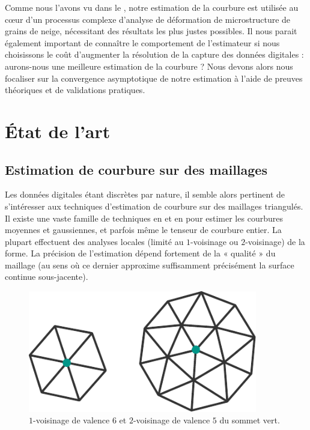 Comme nous l'avons vu dans le , notre estimation
de la courbure est utilisée au cœur d'un processus complexe d'analyse de
déformation de microstructure de grains de neige, nécessitant des résultats les
plus justes possibles. Il nous parait également important de connaître le
comportement de l'estimateur si nous choisissons le coût d'augmenter la résolution
de la capture des données digitales : aurons-nous une meilleure estimation de la
courbure ? Nous devons alors nous focaliser sur la convergence asymptotique de
notre estimation à l'aide de preuves théoriques et de validations pratiques.
%
\section{État de l'art}%
\label{sec:estimators:SOTA}
%
\subsection{Estimation de courbure sur des maillages}
%
Les données digitales étant discrètes par nature, il semble alors pertinent de
s'intéresser aux techniques d'estimation de courbure sur des maillages
triangulés. Il existe une vaste famille de techniques en \ComputerGraphics et en
\GeometryProcessing pour estimer les courbures moyennes et gaussiennes, et
parfois même le tenseur de courbure entier. La plupart effectuent des analyses
locales (\cad limité au $1$-voisinage ou $2$-voisinage) de la forme. La
précision de l'estimation dépend fortement de la « qualité » du maillage (au
sens où ce dernier approxime suffisamment précisément la surface continue sous-jacente).

\begin{figure}[ht]
    \begin{center}
      \includegraphics[width=10cm]{figures/OneRingNeighborhood}
    \end{center}
    \caption{$1$-voisinage de valence $6$ et
    $2$-voisinage de valence $5$ du sommet vert.}
    \label{fig:one-ring-neighborhood}
\end{figure}

